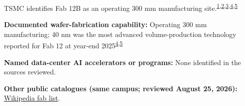 \begin{minipage}[t][0.90\textheight][t]{\textwidth}
\begin{minipage}[t]{\textwidth}
\begin{minipage}[t]{0.32\textwidth}
\medskip
{\footnotesize TSMC identifies Fab 12B as an operating 300 mm manufacturing site.\nobreak\textsuperscript{\href{\detokenize{https://www.openstreetmap.org/way/717426548}}{\textcolor{accent}{1}},\href{\detokenize{https://www.tsmc.com/english/aboutTSMC/TSMC_Fabs}}{\textcolor{accent}{2}},\href{\detokenize{https://investor.tsmc.com/sites/ir/annual-report/2024/2024}\%\detokenize{20Annual}\%\detokenize{20Report-E.pdf}}{\textcolor{accent}{3}},\href{\detokenize{https://web.archive.org/web/20260822170034/https://www.tsmc.com/english/aboutTSMC/executives.htm}}{\textcolor{accent}{4}},\href{\detokenize{https://investor.tsmc.com/sites/ir/sec-filings/2025_20F}\%\detokenize{20Report.pdf}}{\textcolor{accent}{5}}}\par}
\medskip
{\footnotesize\textbf{Documented wafer-fabrication capability:} Operating 300 mm manufacturing; 40 nm was the most advanced volume-production technology reported for Fab 12 at year-end 2025\nobreak\textsuperscript{\href{\detokenize{https://web.archive.org/web/20260822170034/https://www.tsmc.com/english/aboutTSMC/executives.htm}}{\textcolor{accent}{4}},\href{\detokenize{https://investor.tsmc.com/sites/ir/sec-filings/2025_20F}\%\detokenize{20Report.pdf}}{\textcolor{accent}{5}}}\par}
\end{minipage}
\end{minipage}
\par\vspace{0.65em}
\medskip
{\footnotesize\textbf{Named data-center AI accelerators or programs:} None identified in the sources reviewed.\par}
\smallskip
{\sffamily\scriptsize\color{black!62}\textbf{Other public catalogues (same campus; reviewed August 25, 2026):} \href{\detokenize{https://en.wikipedia.org/w/index.php?title=List_of_semiconductor_fabrication_plants&oldid=1370451124}\#\detokenize{Open_plants}}{Wikipedia fab list}.\par}
\medskip

\end{minipage}
